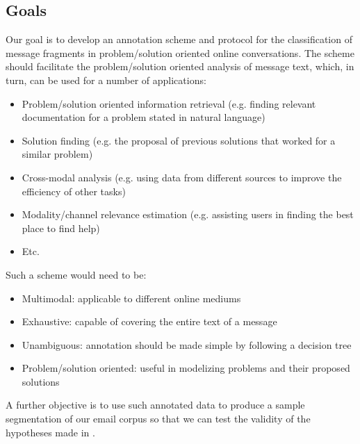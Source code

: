 \subsection{Goals}

Our goal is to develop an annotation scheme and protocol for the classification of message fragments in problem/solution oriented online conversations. The scheme should facilitate the problem/solution oriented analysis of message text, which, in turn, can be used for a number of applications:

\begin{itemize}
	\item Problem/solution oriented information retrieval (e.g. finding relevant documentation for a problem stated in natural language)
	\item Solution finding (e.g. the proposal of previous solutions that worked for a similar problem)
	\item Cross-modal analysis (e.g. using data from different sources to improve the efficiency of other tasks)
	\item Modality/channel relevance estimation (e.g. assisting users in finding the best place to find help)
	\item Etc.
\end{itemize}

Such a scheme would need to be:

\begin{itemize}
	\item Multimodal: applicable to different online mediums
	\item Exhaustive: capable of covering the entire text of a message
	\item Unambiguous: annotation should be made simple by following a decision tree
	\item Problem/solution oriented: useful in modelizing problems and their proposed solutions
\end{itemize}

A further objective is to use such annotated data to produce a sample segmentation of our email corpus so that we can test the validity of the hypotheses made in \cite{hernandez2014exploiting}.